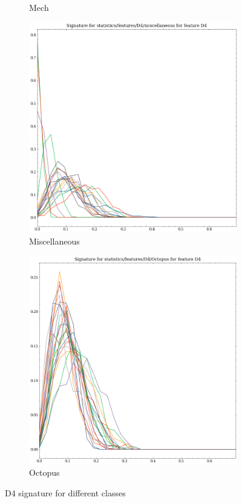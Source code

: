 \begin{figure}[t!p]
\begin{subfigure}[b]{0.23\textwidth}
        \caption{Mech}
    \end{subfigure}
    \hfill
    \begin{subfigure}[b]{0.23\textwidth}
        \includegraphics[width=\textwidth]{assets/feature_extraction/D4/miscellaneous.png}
        \caption{Miscellaneous}
    \end{subfigure}
    \hfill
    \begin{subfigure}[b]{0.23\textwidth}
        \includegraphics[width=\textwidth]{assets/feature_extraction/D4/Octopus.png}
        \caption{Octopus}
    \end{subfigure}
    \hfill
    \caption{D4 signature for different classes}
    \label{fig:D4-signatures-1}
\end{figure}

